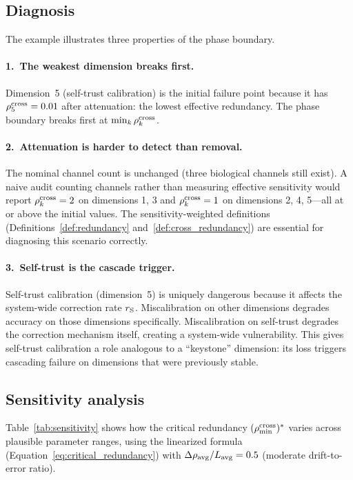 \subsection{Diagnosis}

The example illustrates three properties of the phase boundary.

\paragraph{1.\ The weakest dimension breaks first.}
Dimension~5 (self-trust calibration) is the initial failure point
because it has $\rho^{\mathrm{cross}}_5 = 0.01$ after attenuation: the lowest
effective redundancy.  The phase boundary breaks first at
$\min_k \rho^{\mathrm{cross}}_k$.

\paragraph{2.\ Attenuation is harder to detect than removal.}
The nominal channel count is unchanged (three biological channels still
exist).  A naive audit counting channels rather than measuring
effective sensitivity would report $\rho^{\mathrm{cross}}_k = 2$ on dimensions 1, 3
and $\rho^{\mathrm{cross}}_k = 1$ on dimensions 2, 4, 5---all at or above the
initial values.  The sensitivity-weighted definitions
(Definitions~\ref{def:redundancy} and~\ref{def:cross_redundancy})
are essential for diagnosing this scenario correctly.

\paragraph{3.\ Self-trust is the cascade trigger.}
Self-trust calibration (dimension~5) is uniquely dangerous because it
affects the system-wide correction rate $r_{\mathrm{S}}$.  Miscalibration on
other dimensions degrades accuracy on those dimensions specifically.
Miscalibration on self-trust degrades the correction mechanism
itself, creating a system-wide vulnerability.  This gives self-trust
calibration a role analogous to a ``keystone'' dimension: its loss
triggers cascading failure on dimensions that were previously stable.

\subsection{Sensitivity analysis}

Table~\ref{tab:sensitivity} shows how the critical redundancy
$(\rho_{\min}^{\mathrm{cross}})^*$ varies across plausible parameter ranges, using the
linearized formula (Equation~\ref{eq:critical_redundancy}) with
$\Delta\rho_{\mathrm{avg}} / L_{\mathrm{avg}} = 0.5$
(moderate drift-to-error ratio).

